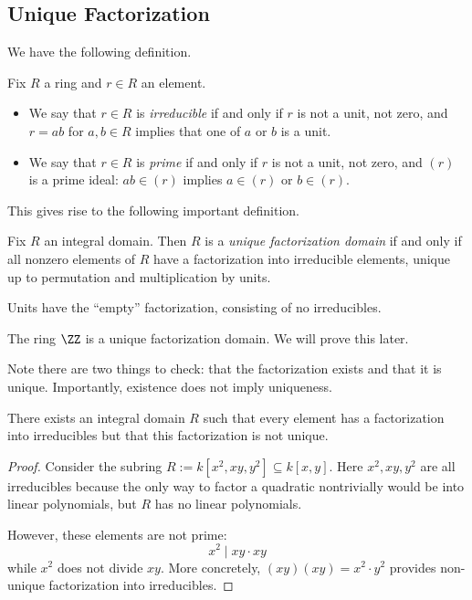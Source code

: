 \subsection{Unique Factorization}
We have the following definition.
\begin{definition}
	Fix $R$ a ring and $r\in R$ an element.
	\begin{itemize}
		\item We say that $r\in R$ is \textit{irreducible} if and only if $r$ is not a unit, not zero, and $r=ab$ for $a,b\in R$ implies that one of $a$ or $b$ is a unit.
		\item We say that $r\in R$ is \textit{prime} if and only if $r$ is not a unit, not zero, and $(r)$ is a prime ideal: $ab\in(r)$ implies $a\in(r)$ or $b\in(r)$.
	\end{itemize}
\end{definition}
This gives rise to the following important definition.
\begin{definition}
	Fix $R$ an integral domain. Then $R$ is a \textit{unique factorization domain} if and only if all nonzero elements of $R$ have a factorization into irreducible elements, unique up to permutation and multiplication by units.
\end{definition}
\begin{remark}
	Units have the ``empty'' factorization, consisting of no irreducibles.
\end{remark}
\begin{example}
	The ring $\ZZ$ is a unique factorization domain. We will prove this later.
\end{example}
Note there are two things to check: that the factorization exists and that it is unique. Importantly, existence does not imply uniqueness.
\begin{exe}
	There exists an integral domain $R$ such that every element has a factorization into irreducibles but that this factorization is not unique.
\end{exe}
\begin{proof}
	Consider the subring $R:=k\left[x^2,xy,y^2\right]\subseteq k[x,y]$. Here $x^2,xy,y^2$ are all irreducibles because the only way to factor a quadratic nontrivially would be into linear polynomials, but $R$ has no linear polynomials.
	
	However, these elements are not prime:
	\[x^2\mid xy\cdot xy\]
	while $x^2$ does not divide $xy$. More concretely, $(xy)(xy)=x^2\cdot y^2$ provides non-unique factorization into irreducibles.
\end{proof}
